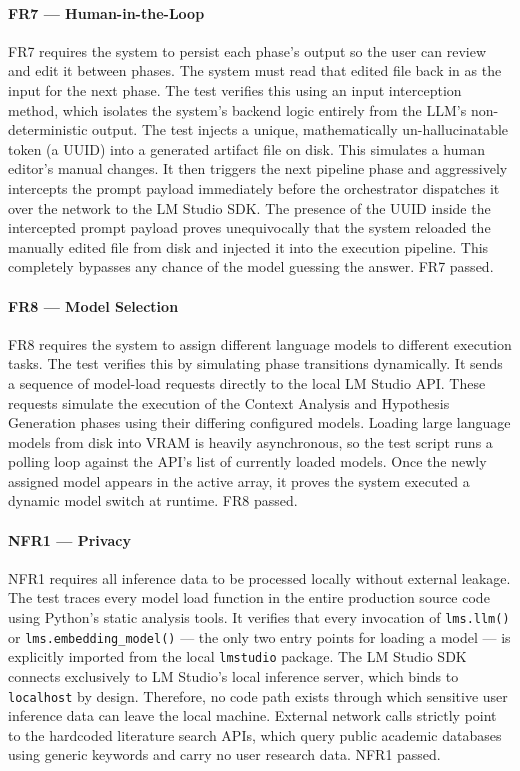 \paragraph{FR7 — Human-in-the-Loop}
FR7 requires the system to persist each phase's output so the user can review and edit it between phases.
The system must read that edited file back in as the input for the next phase.
The test verifies this using an input interception method, which isolates the system's backend logic entirely from the LLM's non-deterministic output.
The test injects a unique, mathematically un-hallucinatable token (a UUID) into a generated artifact file on disk.
This simulates a human editor's manual changes.
It then triggers the next pipeline phase and aggressively intercepts the prompt payload immediately before the orchestrator dispatches it over the network to the LM Studio SDK.
The presence of the UUID inside the intercepted prompt payload proves unequivocally that the system reloaded the manually edited file from disk and injected it into the execution pipeline.
This completely bypasses any chance of the model guessing the answer.
FR7 passed.

\paragraph{FR8 — Model Selection}
FR8 requires the system to assign different language models to different execution tasks.
The test verifies this by simulating phase transitions dynamically.
It sends a sequence of model-load requests directly to the local LM Studio API.
These requests simulate the execution of the Context Analysis and Hypothesis Generation phases using their differing configured models.
Loading large language models from disk into VRAM is heavily asynchronous, so the test script runs a polling loop against the API's list of currently loaded models.
Once the newly assigned model appears in the active array, it proves the system executed a dynamic model switch at runtime.
FR8 passed.

\paragraph{NFR1 — Privacy}
NFR1 requires all inference data to be processed locally without external leakage.
The test traces every model load function in the entire production source code using Python's static analysis tools.
It verifies that every invocation of \texttt{lms.llm()} or \texttt{lms.embedding\_model()} — the only two entry points for loading a model — is explicitly imported from the local \texttt{lmstudio} package.
The LM Studio SDK connects exclusively to LM Studio's local inference server, which binds to \texttt{localhost} by design.
Therefore, no code path exists through which sensitive user inference data can leave the local machine.
External network calls strictly point to the hardcoded literature search APIs, which query public academic databases using generic keywords and carry no user research data.
NFR1 passed.


